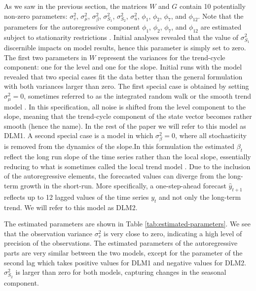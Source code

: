 \documentclass[12pt, a4paper]{article}
\begin{document}
As we saw in the previous section, the matrices $W$ and $G$ contain 10 potentially non-zero parameters: $\sigma_{v}^{2}$, $\sigma_{\mu}^{2}$, $\sigma_{\beta}^{2}$, $\sigma_{S_{1}}^{2}$, $\sigma_{S_{2}}^{2}$, $\sigma^{2}_{u}$, $\phi_{1}$, $\phi_{2}$, $\phi_{7}$, and
$\phi_{12}$. Note that the parameters for the autoregressive
component $\phi_{1}$, $\phi_{2}$, $\phi_{7}$, and $\phi_{12}$ are estimated subject to stationarity restrictions \citep{monahan1984note}. Initial analyses revealed that the value of $\sigma_{S_{1}}^{2}$ discernible impacts on model results, hence this parameter is simply set to zero. The first two parameters in $W$ represent the variances for the trend-cycle component: one for the level and one for the
slope. Initial runs with the model revealed that two
special cases fit the data better than the general formulation with both variances larger than zero. The
first special case is obtained by setting $\sigma^{2}_{\mu} = 0$,
sometimes referred to as the integrated random walk or the smooth trend
model \citep{young1991recursive}. In this specification, all noise is shifted from the level component to the slope,
meaning that the trend-cycle component of the state vector becomes rather smooth (hence the
name). In the rest of the paper we will refer to this model as DLM1. A
second special case is a model in which $\sigma^{2}_{\beta} = 0$,
where all stochasticity is removed from the dynamics of the slope.In
this formulation the estimated $\beta_{t}$ reflect the long run slope
of the time series rather than the local slope, essentially reducing to what is sometimes called the local trend model \citep{durbin2012time}. Due to the inclusion of the autoregressive elements, the forecasted
values can diverge from the long-term growth in the short-run. More
specifically, a one-step-ahead forecast $\hat{y}_{t + 1}$ reflects up
to 12 lagged values of the time series $y_{t}$ and not only the long-term trend. We will refer to this model as DLM2. 

The estimated parameters are shown in Table
\ref{tab:estimated-parameters}.  We see that the observation variance
$\sigma_{v}^{2}$ is very close to zero, indicating a high level of
precision of the observations. The estimated parameters of the autoregressive parts are very similar between the two models, except for the parameter of the second lag which takes positive values for DLM1 and negative values for DLM2. $\sigma_{S_{2}}^{2}$ is larger than zero for both models, capturing changes in the seasonal component.
\end{document}
